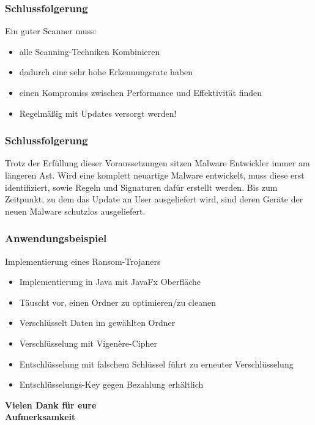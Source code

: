 \documentclass{beamer}
\begin{document}
\begin{frame}
	\frametitle{Schlussfolgerung}
	Ein guter Scanner muss:
	\begin{itemize}
		\item alle Scanning-Techniken Kombinieren
		\item dadurch eine sehr hohe Erkennungsrate haben
		\item einen Kompromiss zwischen Performance und Effektivität finden
		\item Regelmäßig mit Updates versorgt werden!
	\end{itemize}
\end{frame}

\begin{frame}
	\frametitle{Schlussfolgerung}
	\begin{block}{}
		Trotz der Erfüllung dieser Voraussetzungen sitzen Malware Entwickler immer am längeren Ast. Wird eine komplett neuartige Malware entwickelt, muss diese erst identifiziert, sowie Regeln und Signaturen dafür erstellt werden. Bis zum Zeitpunkt, zu dem das Update an User ausgeliefert wird, sind deren Geräte der neuen Malware schutzlos ausgeliefert.
	\end{block}
\end{frame}

\begin{frame}
	\frametitle{Anwendungsbeispiel}
	Implementierung eines Ransom-Trojaners
	\begin{itemize}
		\item Implementierung in Java mit JavaFx Oberfläche
		\item Täuscht vor, einen Ordner zu optimieren/zu cleanen
		\item Verschlüsselt Daten im gewählten Ordner
		\item Verschlüsselung mit Vigenère-Cipher
		\item Entschlüsselung mit falschem Schlüssel führt zu erneuter Verschlüsselung
		\item Entschlüsselungs-Key gegen Bezahlung erhältlich
	\end{itemize}
	
\end{frame}

\begin{frame}
	\begin{center}
	\LARGE{\textbf{ Vielen Dank für eure \\Aufmerksamkeit}}
	\end{center}
\end{frame}
\end{document}
